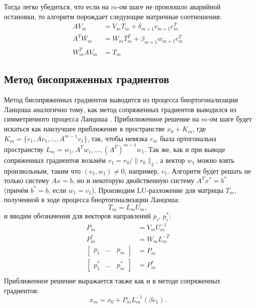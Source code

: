 Тогда легко убедиться, что если на $m$-ом шаге не произошло аварийной остановки, 
то алгоритм порождает следующие матричные соотношения:
\begin{align*}
    AV_m &= V_m T_m + \delta_{m+1} v_{m+1} e_m^T\\
    A^T W_m &= W_m T^T_m + \beta_{m+1} w_{m+1} e_m^T \\
    W_m^T A V_m &= T_m  
\end{align*}

\subsection[Метод бисопряженных градиентов]{Метод бисопряженных градиентов }
\par Метод бисопряженных градиентов выводится из процесса биортогонализации Ланцоша
аналогично тому, как метод сопряженных градиентов выводился из симметричного процесса
Ланцоша \cite{Saad2003}. Прибилиженное решение на $m$-ом шаге будет искаться как наилучшее приближение в 
пространстве $x_0 + K_m$, где $K_m = \{v_1, Av_1,...,A^{m-1}v_1\}$, так, чтобы невязка 
$r_m$ была ортогональна пространству $L_m = {w_1,A^T w_1, ... ,(A^T)^{m-1} w_1}$. Так же, 
как и при выводе сопряженных градиентов возьмём $v_1 = r_0 / \| r_0 \|_2$, а вектор 
$w_1$ можно взять произвольным, таким что $(v_1, w_1) \neq 0$, например, $v_1$. Алгоритм
будет решать не только систему $Ax=b$, но и некоторую двойственную систему $A^T x^* = b^*$ (причём
 $b^*=b$, если $w_1 = v_1$).
Производим LU-разложение для матрицы $T_m$, полученной в ходе процесса биортогонализации Ланцоша:
\begin{equation*}
    T_m = L_m U_m,
\end{equation*}
и вводим обозначения для векторов направлений $p_i$, $p_i^*$:
\begin{align*}
    P_m &= V_m U_m^{-1} \\
    P_m^* &= W_m L_m^{-T} \\
    \begin{bmatrix} p_1 & ... & p_m \end{bmatrix} &= P_m \\
    \begin{bmatrix} p_1^* & ... & p_m^* \end{bmatrix} &= P_m^* \\
\end{align*} 
Приближенное решение выражается также как и в методе сопряженных градиентов:
\begin{equation*}
    x_m = x_0 + P_m L_m^{-1} (\beta e_1).
\end{equation*}
